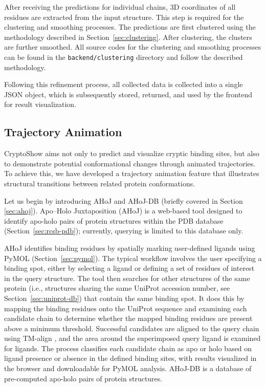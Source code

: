 After receiving the predictions for individual chains, 3D coordinates of all residues are extracted from the input structure. This step is required for the clustering and smoothing processes. The predictions are first clustered using the methodology described in Section~\ref{sec:clustering}. After clustering, the clusters are further smoothed. All source codes for the clustering and smoothing processes can be found in the \lstinline!backend/clustering! directory and follow the described methodology.

Following this refinement process, all collected data is collected into a single JSON object, which is subsequently stored, returned, and used by the frontend for result visualization.

\subsection{Trajectory Animation}
\label{sec:trajectory}

CryptoShow aims not only to predict and visualize cryptic binding sites, but also to demonstrate potential conformational changes through animated trajectories. To achieve this, we have developed a trajectory animation feature that illustrates structural transitions between related protein conformations.

Let us begin by introducing AHoJ \cite{feidakis2022ahoj} and AHoJ-DB \cite{feidakis2024ahoj} (briefly covered in Section \ref{sec:ahoj}). Apo–Holo Juxtaposition (AHoJ) is a web-based tool designed to identify apo-holo pairs of protein structures within the PDB database (Section~\ref{sec:rcsb-pdb}); currently, querying is limited to this database only.

AHoJ identifies binding residues by spatially marking user-defined ligands using PyMOL (Section~\ref{sec:pymol}). The typical workflow involves the user specifying a binding spot, either by selecting a ligand or defining a set of residues of interest in the query structure. The tool then searches for other structures of the same protein (i.e., structures sharing the same UniProt accession number, see Section~\ref{sec:uniprot-db}) that contain the same binding spot. It does this by mapping the binding residues onto the UniProt sequence and examining each candidate chain to determine whether the mapped binding residues are present above a minimum threshold. Successful candidates are aligned to the query chain using TM-align \cite{zhang2005tm}, and the area around the superimposed query ligand is examined for ligands. The process classifies each candidate chain as apo or holo based on ligand presence or absence in the defined binding sites, with results visualized in the browser and downloadable for PyMOL analysis. AHoJ-DB is a database of pre-computed apo-holo pairs of protein structures.

